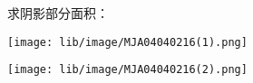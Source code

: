 求阴影部分面积：

\begin{center}

    \texttt{[image: lib/image/MJA04040216(1).png]}\qquad\qquad\qquad

    \texttt{[image: lib/image/MJA04040216(2).png]}

\end{center}



